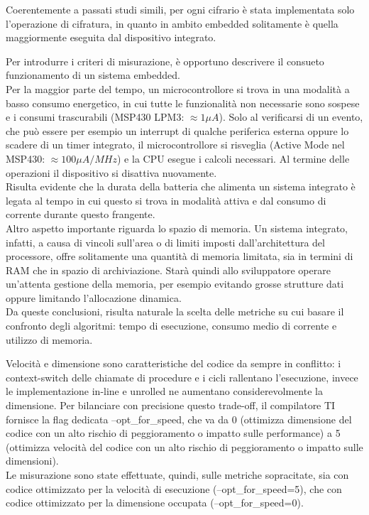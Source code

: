 \documentclass[target=bach,aauheader=,style=]{thud}
\begin{document}
	Coerentemente a passati studi simili, %
	per ogni cifrario è stata implementata solo l'operazione di cifratura, in quanto in ambito embedded solitamente è quella maggiormente eseguita dal dispositivo integrato.
	
	Per introdurre i criteri di misurazione, è opportuno descrivere il consueto funzionamento di un sistema embedded.\\
	Per la maggior parte del tempo, un microcontrollore si trova in una modalità a basso consumo energetico, in cui tutte le funzionalità non necessarie sono sospese e i consumi trascurabili (MSP430 LPM3: $\approx 1 \mu A$). Solo al verificarsi di un evento, che può essere per esempio un interrupt di qualche periferica esterna oppure lo scadere di un timer integrato, il microcontrollore si risveglia (Active Mode nel MSP430: $\approx 100 \mu A /MHz$) e la CPU esegue i calcoli necessari. Al termine delle operazioni il dispositivo si disattiva nuovamente.\\
	Risulta evidente che la durata della batteria che alimenta un sistema integrato è legata al tempo in cui questo si trova in modalità attiva e dal consumo di corrente durante questo frangente.\\
	Altro aspetto importante riguarda lo spazio di memoria. Un sistema integrato, infatti, a causa di vincoli sull'area o di limiti imposti dall'architettura del processore, offre solitamente una quantità di memoria limitata, sia in termini di RAM che in spazio di archiviazione. Starà quindi allo sviluppatore operare un'attenta gestione della memoria, per esempio evitando grosse strutture dati oppure limitando l'allocazione dinamica.\\
	Da queste conclusioni, risulta naturale la scelta delle metriche su cui basare il confronto degli algoritmi: tempo di esecuzione, consumo medio di corrente e utilizzo di memoria.
	
	Velocità e dimensione sono caratteristiche del codice da sempre in conflitto: i context-switch delle chiamate di procedure e i cicli rallentano l'esecuzione, invece le implementazione in-line e unrolled ne aumentano considerevolmente la dimensione. Per bilanciare con precisione questo trade-off, il compilatore TI fornisce la flag dedicata --opt\_for\_speed, che va da 0 (ottimizza dimensione del codice con un alto rischio di peggioramento o impatto sulle performance) a 5 (ottimizza velocità del codice con un alto rischio di peggioramento o impatto sulle dimensioni).\\
	Le misurazione sono state effettuate, quindi, sulle metriche sopracitate, sia con codice ottimizzato per la velocità di esecuzione (--opt\_for\_speed=5), che con codice ottimizzato per la dimensione occupata (--opt\_for\_speed=0).
	
\end{document}
